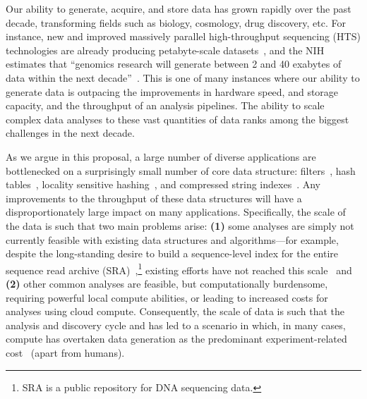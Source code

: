 Our ability to generate, acquire, and store data has grown rapidly over
the past decade, transforming fields such as biology, cosmology, drug
discovery, etc.   
For
instance, new and improved
massively parallel high-throughput sequencing (HTS) technologies  are already producing petabyte-scale
datasets~\cite{kodama2012sequence}, and the NIH estimates that ``genomics
research will generate between 2 and 40 exabytes of data within the next
decade''~\cite{NHGRIDataScience}.
This is one of many instances where our
ability to generate data is outpacing the improvements in hardware speed, and
storage capacity, and the throughput of an analysis pipelines.
The ability to scale complex data analyses to these vast quantities of data ranks among the biggest challenges in the next decade.

As we argue in this proposal, a large number of diverse applications are bottlenecked on a surprisingly small number of core data structure: filters~\cite{PandeyAlBe18, solomon2016fast},
hash tables~\cite{solomon2016fast,almodaresi2022incrementally}, locality
sensitive hashing~\cite{Marais2019}, and compressed string
indexes~\cite{Almodaresi2018Pufferfish}. 
Any improvements to the throughput of these data structures will have a disproportionately large impact on many applications. 
Specifically, the scale of the data is
such that two main problems arise: \textbf{(1)} some analyses are simply not
currently feasible with existing data structures and algorithms---for example,
despite the long-standing desire to build a sequence-level index for the entire
sequence read archive (SRA)~\cite{SRA},\footnote{SRA is a public repository for DNA sequencing data.} existing efforts have not reached this
scale~\cite{Karasikov2020, HarrisM20, SolomonK17, almodaresi2022incrementally,
AlmodaresiPFJP20,PandeyAlBe18} and \textbf{(2)} other common analyses are
feasible, but computationally burdensome, requiring powerful local compute
abilities, or leading to increased costs for analyses using cloud compute.  Consequently, the scale of data is such that the analysis and discovery cycle and has led to a scenario in
which, in many cases, compute has overtaken data generation as the predominant
experiment-related cost~\cite{Muir_2016} (apart from humans).

